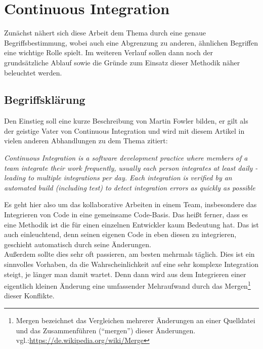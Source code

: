 \pagebreak
\chapter{Continuous Integration}
Zunächst nähert sich diese Arbeit dem Thema durch eine genaue Begriffsbestimmung, wobei auch eine Abgrenzung zu anderen, ähnlichen Begriffen eine wichtige Rolle spielt. Im weiteren Verlauf sollen dann noch der grundsätzliche Ablauf sowie die Gründe zum Einsatz dieser Methodik näher beleuchtet werden.\\
\section{Begriffsklärung}
Den Einstieg soll eine kurze Beschreibung von Martin Fowler bilden, er gilt als der geistige Vater von Continuous Integration und wird mit diesem Artikel in vielen anderen Abhandlungen zu dem Thema zitiert:
\begin{center}
	\textit{
	Continuous Integration is a software development practice where members of a team integrate their work frequently, usually each person integrates at least daily - leading to multiple integrations per day. Each integration is verified by an automated build (including test) to detect integration errors as quickly as possible}\\ \cite{fowler-CI}
\end{center}
Es geht hier also um das kollaborative Arbeiten in einem Team, insbesondere das Integrieren von Code in eine gemeinsame Code-Basis. Das heißt ferner, dass es eine Methodik ist die für einen einzelnen Entwickler kaum Bedeutung hat. Das ist auch einleuchtend, denn seinen eigenen Code in eben diesen zu integrieren, geschieht automatisch durch seine Änderungen. \\
Außerdem sollte dies sehr oft passieren, am besten mehrmals täglich. Dies ist ein sinnvolles Vorhaben, da die Wahrscheinlichkeit auf eine sehr komplexe Integration steigt, je länger man damit wartet. Denn dann wird aus dem Integrieren einer eigentlich kleinen Änderung eine umfassender Mehraufwand durch das Mergen\footnote{Mergen bezeichnet das Vergleichen mehrerer Änderungen an einer Quelldatei und das Zusammenführen ("`mergen"') dieser Änderungen. vgl.:\url{https://de.wikipedia.org/wiki/Merge}} dieser Konflikte.\\
